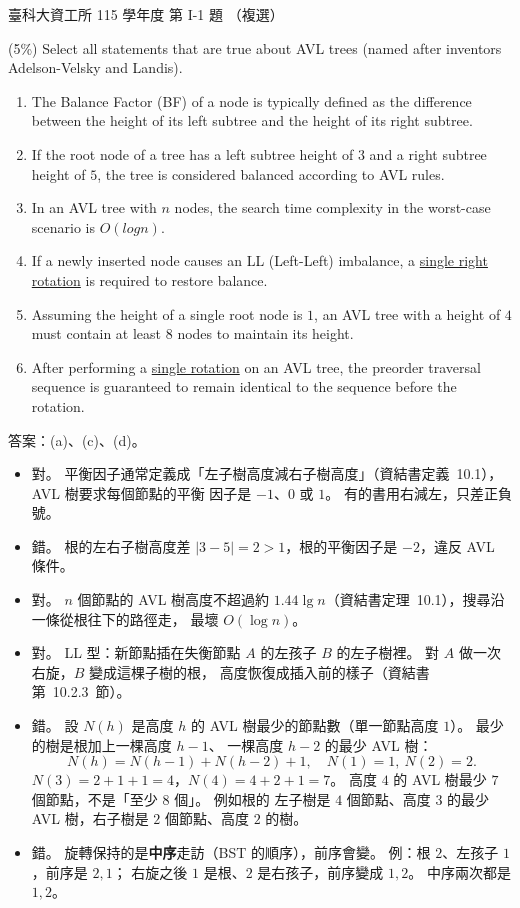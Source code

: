 \begin{pastexam}[label={px:ntust-115-ice-01}]{臺科大資工所 115 學年度 第 I-1 題}
（複選）

(5\%) Select all statements that are true about AVL trees (named after inventors Adelson-Velsky and
Landis).
\begin{enumerate}[label=(\alph*)]
\item The Balance Factor (BF) of a node is typically defined as the difference between the height of its
left subtree and the height of its right subtree.
\item If the root node of a tree has a left subtree height of $3$ and a right subtree height of $5$, the tree
is considered balanced according to AVL rules.
\item In an AVL tree with $n$ nodes, the search time complexity in the worst-case scenario is $O(logn)$.
\item If a newly inserted node causes an LL (Left-Left) imbalance, a \underline{single right rotation} is
required to restore balance.
\item Assuming the height of a single root node is $1$, an AVL tree with a height of $4$ must contain at
least $8$ nodes to maintain its height.
\item After performing a \underline{single rotation} on an AVL tree, the preorder traversal sequence is
guaranteed to remain identical to the sequence before the rotation.
\end{enumerate}
\end{pastexam}

\begin{pastsoln}
答案：(a)、(c)、(d)。

\begin{itemize}
\item[(a)] 對。 平衡因子通常定義成「左子樹高度減右子樹高度」（資結書定義~10.1），AVL 樹要求每個節點的平衡
因子是 $-1$、$0$ 或 $1$。 有的書用右減左，只差正負號。
\item[(b)] 錯。 根的左右子樹高度差 $|3 - 5| = 2 > 1$，根的平衡因子是 $-2$，違反 AVL 條件。
\item[(c)] 對。 $n$ 個節點的 AVL 樹高度不超過約 $1.44 \lg n$（資結書定理~10.1），搜尋沿一條從根往下的路徑走，
最壞 $O(\log n)$。
\item[(d)] 對。 LL 型：新節點插在失衡節點 $A$ 的左孩子 $B$ 的左子樹裡。 對 $A$ 做一次右旋，$B$ 變成這棵子樹的根，
高度恢復成插入前的樣子（資結書第~10.2.3~節）。
\item[(e)] 錯。 設 $N(h)$ 是高度 $h$ 的 AVL 樹最少的節點數（單一節點高度 $1$）。 最少的樹是根加上一棵高度 $h - 1$、
一棵高度 $h - 2$ 的最少 AVL 樹：
\[
N(h) = N(h-1) + N(h-2) + 1, \quad N(1) = 1,\ N(2) = 2 .
\]
$N(3) = 2 + 1 + 1 = 4$，$N(4) = 4 + 2 + 1 = 7$。 高度 $4$ 的 AVL 樹最少 $7$ 個節點，不是「至少 $8$ 個」。 例如根的
左子樹是 $4$ 個節點、高度 $3$ 的最少 AVL 樹，右子樹是 $2$ 個節點、高度 $2$ 的樹。
\item[(f)] 錯。 旋轉保持的是\textbf{中序}走訪（BST 的順序），前序會變。 例：根 $2$、左孩子 $1$，前序是 $2, 1$；
右旋之後 $1$ 是根、$2$ 是右孩子，前序變成 $1, 2$。 中序兩次都是 $1, 2$。
\end{itemize}
\end{pastsoln}
